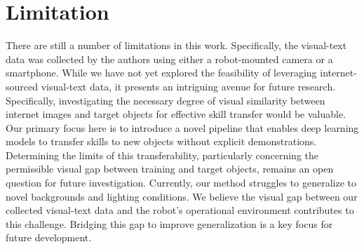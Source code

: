 \section{Limitation}
There are still a number of limitations in this work. Specifically, the visual-text data was collected by the authors using either a robot-mounted camera or a smartphone. While we have not yet explored the feasibility of leveraging internet-sourced visual-text data, it presents an intriguing avenue for future research.  Specifically,  investigating the necessary degree of visual similarity between internet images and target objects for effective skill transfer would be valuable. Our primary focus here is to introduce a novel pipeline that enables deep learning models to transfer skills to new objects without explicit demonstrations.  Determining the limits of this transferability, particularly concerning the permissible visual gap between training and target objects, remains an open question for future investigation. Currently, our method struggles to generalize to novel backgrounds and lighting conditions. We believe the visual gap between our collected visual-text data and the robot's operational environment contributes to this challenge.  Bridging this gap to improve generalization is a key focus for future development.

